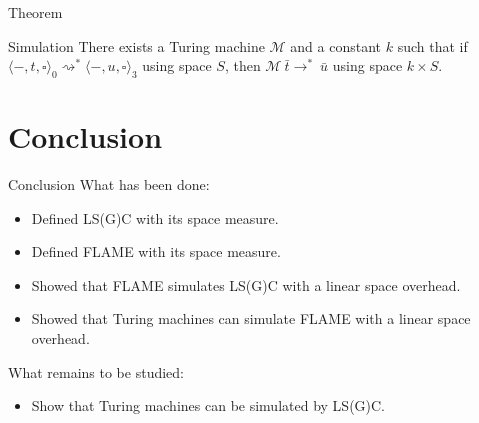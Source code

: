 \documentclass[dvipsnames]{beamer}
\newcommand{\ra}{\rightarrow}
\newcommand{\rsa}{\rightsquigarrow}
\newcommand{\etatz}[1]{\langle #1 \rangle_0}
\newcommand{\etatt}[1]{\langle #1 \rangle_3}
\begin{document}
\begin{frame}{Theorem}
  \begin{alertblock}{Simulation}
  There exists a Turing machine $\mathcal{M}$ and a constant $k$ such that if $\etatz{-, t, \square} \rsa^{*} \etatt{-, u, \square}$ using space $S$, then
$\mathcal{M}~\bar{t} \ra^{*}~\bar{u}$ using space $k\times S$. 
\end{alertblock}
\end{frame}

\section*{Conclusion}
\begin{frame}{Conclusion}
  What has been done:
  \begin{itemize}
    \item Defined LS(G)C with its space measure.
    \item Defined FLAME with its space measure.
    \item Showed that FLAME simulates LS(G)C with a linear space overhead.
    \item Showed that Turing machines can simulate FLAME with a linear space overhead.
  \end{itemize}
  What remains to be studied:
  \begin{itemize}
    \item Show that Turing machines can be simulated by LS(G)C.
  \end{itemize}
\end{frame}
\end{document}
